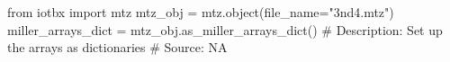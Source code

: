 from iotbx import mtz
mtz_obj = mtz.object(file_name="3nd4.mtz")
miller_arrays_dict = mtz_obj.as_miller_arrays_dict()
# Description:  Set up the arrays as dictionaries
# Source:  NA


